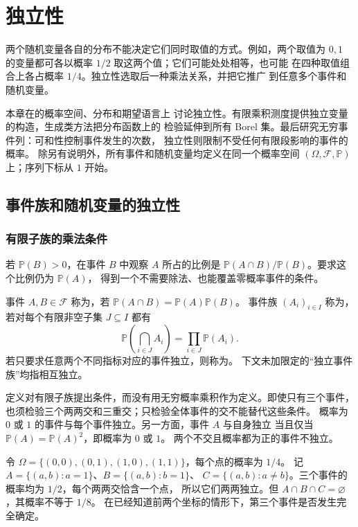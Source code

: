 \chapter{独立性}
\label{chap:independence}

两个随机变量各自的分布不能决定它们同时取值的方式。例如，两个取值为
$0,1$ 的变量都可各以概率 $1/2$ 取这两个值；它们可能处处相等，也可能
在四种取值组合上各占概率 $1/4$。独立性选取后一种乘法关系，并把它推广
到任意多个事件和随机变量。

本章在的概率空间、分布和期望语言上
讨论独立性。有限乘积测度提供独立变量的构造，生成类方法把分布函数上的
检验延伸到所有 Borel 集。最后研究无穷事件列：可和性控制事件发生的次数，
独立性则限制不受任何有限段影响的事件的概率。
除另有说明外，所有事件和随机变量均定义在同一个概率空间
$(\Omega,\mathcal F,\mathbb P)$ 上；序列下标从 $1$ 开始。

\section{事件族和随机变量的独立性}
\label{sec:independent-events-variables}

\subsection{有限子族的乘法条件}

若 $\mathbb P(B)>0$，在事件 $B$ 中观察 $A$ 所占的比例是
$\mathbb P(A\cap B)/\mathbb P(B)$。要求这个比例仍为 $\mathbb P(A)$，
得到一个不需要除法、也能覆盖零概率事件的条件。

\begin{definition}
\label{def:independent-events}
事件 $A,B\in\mathcal F$ 称为，若
$\mathbb P(A\cap B)=\mathbb P(A)\mathbb P(B)$。
事件族 $(A_i)_{i\in I}$ 称为，若对每个有限非空子集
$J\subseteq I$ 都有
\[
 \mathbb P\left(\bigcap_{i\in J}A_i\right)
 =\prod_{i\in J}\mathbb P(A_i).
\]
若只要求任意两个不同指标对应的事件独立，则称为。
下文未加限定的“独立事件族”均指相互独立。
\end{definition}

定义对有限子族提出条件，而没有用无穷概率乘积作为定义。即使只有三个事件，
也须检验三个两两交和三重交；只检验全体事件的交不能替代这些条件。
概率为 $0$ 或 $1$ 的事件与每个事件独立。另一方面，事件 $A$ 与自身独立
当且仅当 $\mathbb P(A)=\mathbb P(A)^2$，即概率为 $0$ 或 $1$。
两个不交且概率都为正的事件不独立。

\begin{example}[两两独立不推出相互独立]
\label{ex:pairwise-not-mutual}
令 $\Omega=\{(0,0),(0,1),(1,0),(1,1)\}$，每个点的概率为 $1/4$。
记 $A=\{(a,b):a=1\}$、$B=\{(a,b):b=1\}$、
$C=\{(a,b):a\ne b\}$。三个事件的概率均为 $1/2$，每个两两交恰含一个点，
所以它们两两独立。但 $A\cap B\cap C=\varnothing$，其概率不等于 $1/8$。
在已经知道前两个坐标的情形下，第三个事件是否发生完全确定。
\end{example}

